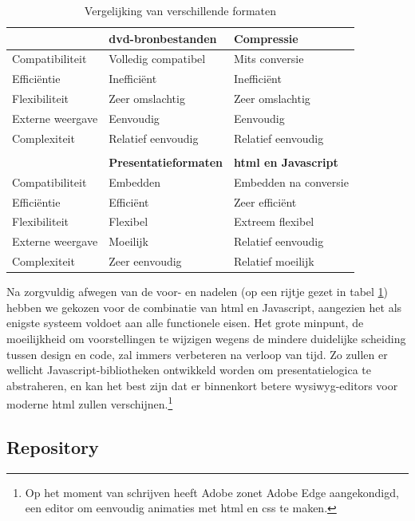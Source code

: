 \begin{table}
  \begin{center}
    \begin{tabular}{p{3cm} | p{4cm} p{4cm}}
    & \textbf{\acs{dvd}-bronbestanden} & \textbf{Compressie} \\
    \hline
    \hline
    Compatibiliteit & Volledig compatibel & Mits conversie \\
    Efficiëntie & Inefficiënt & Inefficiënt \\
    Flexibiliteit & Zeer omslachtig & Zeer omslachtig \\
    Externe weergave & Eenvoudig & Eenvoudig \\
    Complexiteit & Relatief eenvoudig & Relatief eenvoudig \\
    \\    
    & \textbf{Presentatieformaten} & \textbf{\ac{html} en Javascript} \\
    \hline
    \hline
    Compatibiliteit & Embedden & Embedden na conversie \\
    Efficiëntie & Efficiënt & Zeer efficiënt \\
    Flexibiliteit & Flexibel & Extreem flexibel \\
    Externe weergave & Moeilijk & Relatief eenvoudig \\
    Complexiteit & Zeer eenvoudig & Relatief moeilijk \\
    \end{tabular}
  \end{center}
  \caption{Vergelijking van verschillende formaten}
  \label{tbl:voorstellingen:formaten}
\end{table}

Na zorgvuldig afwegen van de voor- en nadelen (op een rijtje gezet in tabel \ref{tbl:voorstellingen:formaten}) hebben we gekozen voor de combinatie van \ac{html} en Javascript, aangezien het als enigste systeem voldoet aan alle functionele eisen. Het grote minpunt, de moeilijkheid om voorstellingen te wijzigen wegens de mindere duidelijke scheiding tussen design en code, zal immers verbeteren na verloop van tijd. Zo zullen er wellicht Javascript-bibliotheken ontwikkeld worden om presentatielogica te abstraheren, en kan het best zijn dat er binnenkort betere \ac{wysiwyg}-editors voor moderne \ac{html} zullen verschijnen.\footnote{Op het moment van schrijven heeft Adobe zonet Adobe Edge aangekondigd, een editor om eenvoudig animaties met \ac{html} en \ac{css} te maken.}

\subsection{Repository}

